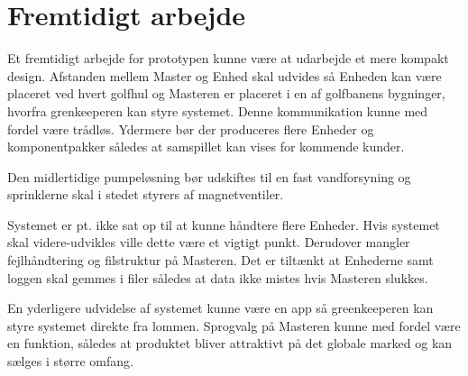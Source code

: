\chapter{Fremtidigt arbejde}

Et fremtidigt arbejde for prototypen kunne være at udarbejde et mere kompakt design. Afstanden mellem Master og Enhed skal udvides så Enheden kan være placeret ved hvert golfhul og Masteren er placeret i en af golfbanens bygninger, hvorfra grenkeeperen kan styre systemet. Denne kommunikation kunne med fordel være trådløs. Ydermere bør der produceres flere Enheder og komponentpakker således at samspillet kan vises for kommende kunder. 

Den midlertidige pumpeløsning bør udskiftes til en fast vandforsyning og sprinklerne skal i stedet styrers af magnetventiler. 

Systemet er pt. ikke sat op til at kunne håndtere flere Enheder. Hvis systemet skal videre-udvikles ville dette være et vigtigt punkt. Derudover mangler fejlhåndtering og filstruktur på Masteren. Det er tiltænkt at Enhederne samt loggen skal gemmes i filer således at data ikke mistes hvis Masteren slukkes.

En yderligere udvidelse af systemet kunne være en app så greenkeeperen kan styre systemet direkte fra lommen. Sprogvalg på Masteren kunne med fordel være en funktion, således at produktet bliver attraktivt på det globale marked og kan sælges i større omfang.